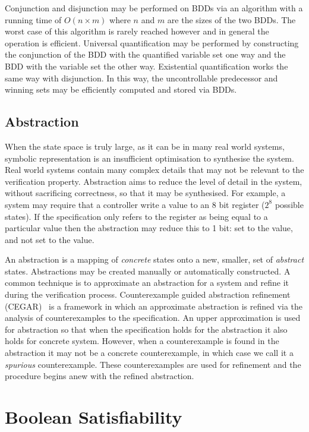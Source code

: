 Conjunction and disjunction may be performed on BDDs via an algorithm with a running time of $O(n \times m)$ where $n$ and $m$ are the sizes of the two BDDs. The worst case of this algorithm is rarely reached however and in general the operation is efficient. Universal quantification may be performed by constructing the conjunction of the BDD with the quantified variable set one way and the BDD with the variable set the other way. Existential quantification works the same way with disjunction. In this way, the uncontrollable predecessor and winning sets may be efficiently computed and stored via BDDs.

\subsection{Abstraction}

When the state space is truly large, as it can be in many real world systems, symbolic representation is an insufficient optimisation to synthesise the system. Real world systems contain many complex details that may not be relevant to the verification property. Abstraction aims to reduce the level of detail in the system, without sacrificing correctness, so that it may be synthesised. For example, a system may require that a controller write a value to an 8 bit register ($2^8$ possible states). If the specification only refers to the register as being equal to a particular value then the abstraction may reduce this to 1 bit: set to the value, and not set to the value.

An abstraction is a mapping of \emph{concrete} states onto a new, smaller, set of  \emph{abstract} states. Abstractions may be created manually or automatically constructed. A common technique is to approximate an abstraction for a system and refine it during the verification process. Counterexample guided abstraction refinement (CEGAR)~\cite{Clarke00} is a framework in which an approximate abstraction is refined via the analysis of counterexamples to the specification. An upper approximation is used for abstraction so that when the specification holds for the abstraction it also holds for concrete system. However, when a counterexample is found in the abstraction it may not be a concrete counterexample, in which case we call it a \emph{spurious} counterexample. These counterexamples are used for refinement and the procedure begins anew with the refined abstraction.

\section{Boolean Satisfiability}

